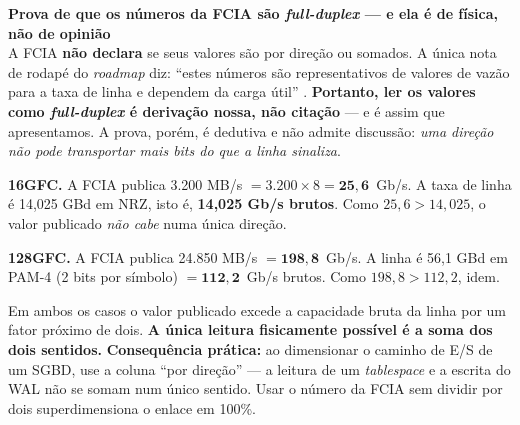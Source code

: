 \documentclass[11pt,a4paper]{article}
\newcommand{\destaque}[2]{%
  \begin{center}\begin{minipage}{0.96\textwidth}
  \colorbox{fundo}{\begin{minipage}{\dimexpr\linewidth-2\fboxsep}
  \vspace{2pt}\textbf{\color{azul}\small #1}\\[1pt]\footnotesize #2\vspace{3pt}
  \end{minipage}}\end{minipage}\end{center}}
\begin{document}
\destaque{Prova de que os números da FCIA são \textit{full-duplex} --- e ela é de física, não de opinião}{%
A FCIA \textbf{não declara} se seus valores são por direção ou somados. A única nota de rodapé do
\textit{roadmap} diz: ``estes números são representativos de valores de vazão para a taxa de linha e
dependem da carga útil'' \cite{fciaroadmap}. \textbf{Portanto, ler os valores como
\textit{full-duplex} é derivação nossa, não citação} --- e é assim que apresentamos. A prova, porém,
é dedutiva e não admite discussão: \emph{uma direção não pode transportar mais bits do que a linha
sinaliza}.

\smallskip
\textbf{16GFC.} A FCIA publica 3.200 MB/s $= 3.200 \times 8 = \mathbf{25{,}6}$~Gb/s. A taxa de
linha é 14,025 GBd em NRZ, isto é, \textbf{14,025 Gb/s brutos}. Como $25{,}6 > 14{,}025$, o valor
publicado \emph{não cabe} numa única direção.

\smallskip
\textbf{128GFC.} A FCIA publica 24.850 MB/s $= \mathbf{198{,}8}$~Gb/s. A linha é 56,1 GBd em PAM-4
(2 bits por símbolo) $= \mathbf{112{,}2}$~Gb/s brutos. Como $198{,}8 > 112{,}2$, idem.

\smallskip
Em ambos os casos o valor publicado excede a capacidade bruta da linha por um fator próximo de
dois. \textbf{A única leitura fisicamente possível é a soma dos dois sentidos.}
\textbf{Consequência prática:} ao dimensionar o caminho de E/S de um SGBD, use a coluna ``por
direção'' --- a leitura de um \textit{tablespace} e a escrita do WAL não se somam num único sentido.
Usar o número da FCIA sem dividir por dois superdimensiona o enlace em 100\%.}
\end{document}
